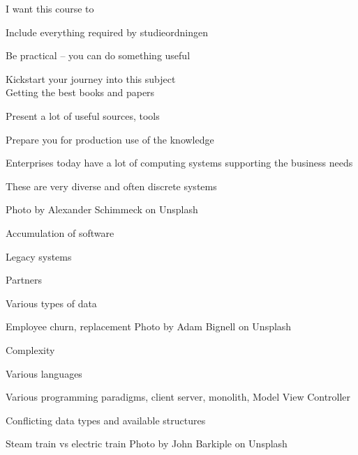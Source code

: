 \documentclass[Screen16to9,17pt]{foils}
\begin{document}
I want this course to
\begin{list2}
\item Include everything required by studieordningen
\item Be practical -- you can do something useful
\item Kickstart your journey into this subject\\
Getting the best books and papers
\item Present a lot of useful sources, tools
\item Prepare you for production use of the knowledge
\end{list2}






\begin{list2}
\item Enterprises today have a lot of computing systems supporting the business needs
\item These are very diverse and often discrete systems
\end{list2}

\hfill Photo by Alexander Schimmeck on Unsplash



\begin{list2}
\item Accumulation of software
\item Legacy systems
\item Partners
\item Various types of data
\item Employee churn, replacement \hfill Photo by Adam Bignell on Unsplash
\end{list2}




\begin{list2}
\item Complexity
\item Various languages
\item Various programming paradigms, client server, monolith, Model View Controller
\item Conflicting data types and available structures
\item Steam train vs electric train \hfill Photo by John Barkiple on Unsplash

\end{list2}
\end{document}
